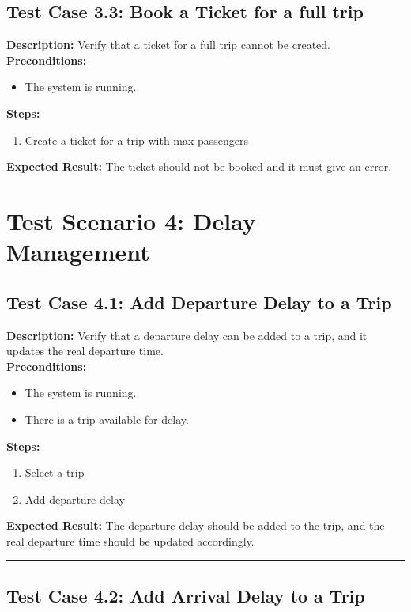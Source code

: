 \documentclass{article}
\begin{document}
\subsection{Test Case 3.3: Book a Ticket for a full trip}

\textbf{Description:} Verify that a ticket for a full trip cannot be created.\\
\textbf{Preconditions:}
\begin{itemize}
  \item The system is running.
\end{itemize}
\textbf{Steps:}
\begin{enumerate}
  \item Create a ticket for a trip with max passengers
\end{enumerate}
\textbf{Expected Result:} The ticket should not be booked and it must give an error.

\pagebreak

\section{Test Scenario 4: Delay Management}
\bigskip
\bigskip
\subsection{Test Case 4.1: Add Departure Delay to a Trip}

\textbf{Description:} Verify that a departure delay can be added to a trip, and it updates the real departure time.\\
\textbf{Preconditions:}
\begin{itemize}
  \item The system is running.
  \item There is a trip available for delay.
\end{itemize}
\textbf{Steps:}
\begin{enumerate}
  \item Select a trip
  \item Add departure delay
\end{enumerate}
\textbf{Expected Result:} The departure delay should be added to the trip, and the real departure time should be updated accordingly.

\bigskip
\hrule
\bigskip

\subsection{Test Case 4.2: Add Arrival Delay to a Trip}
\end{document}
